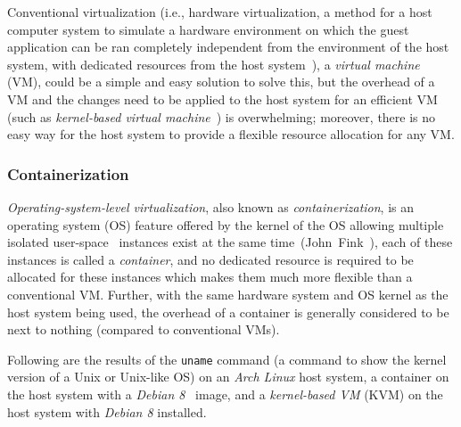 Conventional virtualization (i.e., hardware virtualization, a method for a
host computer system to simulate a hardware environment on which the guest
application can be ran completely independent from the environment of the host
system, with dedicated resources from the host system~\citep[Chap.~16]{os}),
a \emph{virtual machine} (VM), could be a simple and easy solution to solve
this, but the overhead of a VM and the changes need to be applied to the host
system for an efficient VM (such as 
\emph{kernel-based virtual machine}~\cite{kvm}) is overwhelming;
moreover, there is no easy way for the host system to provide a flexible
resource allocation for any VM.

\subsubsection{Containerization}
\emph{Operating-system-level virtualization}, also known as
\emph{containerization}, is an operating system (OS) feature offered by the
kernel of the OS allowing multiple isolated user-space~\citep[Sec.~1.5.1]{os}
instances exist at the same time~(John~Fink~\cite{docker}),
each of these instances is called a \emph{container}, and no dedicated resource
is required to be allocated for these instances which makes them much more
flexible than a conventional VM. Further, with the same hardware system and
OS kernel as the host system being used, the overhead of a container is
generally considered to be next to nothing (compared to conventional VMs).

\pagebreak

Following are the results of the \texttt{uname} command
(a command to show the kernel version of a Unix or Unix-like OS)
on an \emph{Arch Linux} host system, a container on the host system
with a \emph{Debian 8}~\cite{debian} image, and a \emph{kernel-based VM} (KVM)
on the host system with \emph{Debian 8} installed.

\begin{centering}



\end{centering}

